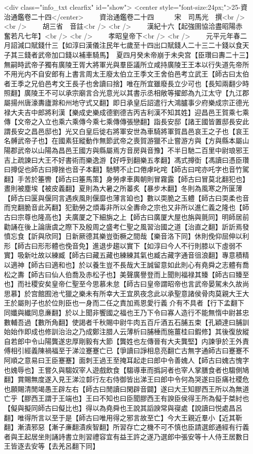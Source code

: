 <div class="info_txt clearfix" id="show">
<center style="font-size:24px;">25-資治通鑑卷二十四</center>
  　　資治通鑑卷二十四　　　宋　司馬光　撰<br />
<br />
　　胡三省　音註<br />
<br />
　　漢紀十六【起強圉協洽盡昭陽赤奮若凡七年】<br />
<br />
　　孝昭皇帝下<br />
<br />
　　元平元年春二月詔減口賦錢什三【如淳曰漢儀注民年七歲至十四出口賦錢人二十三二十錢以食天子其三錢者武帝加口錢以補車騎馬】　夏四月癸未帝崩于未央宫【臣瓚曰夀二十三】無嗣時武帝子獨有廣陵王胥大將軍光與羣臣議所立咸持廣陵王王本以行失道先帝所不用光内不自安郎有上書言周太王廢太伯立王季文王舍伯邑考立武王【師古曰太伯者王季之兄伯邑考文王長子也舍讀曰捨】唯在所宜雖廢長立少可也【長知兩翻少時照翻】廣陵王不可以承宗廟言合光意光以其書示丞相敞等擢郎為九江太守【九江郡屬揚州唐濠夀廬滁和州地守式又翻】即日承皇后詔遣行大鴻臚事少府樂成宗正德光禄大夫吉中郎將利漢【樂成史樂成德劉德吉丙吉利漢不知其姓】迎昌邑王賀乘七乘傳【文帝之入立也乘六乘傳今乘七乘傳傳張戀翻】詣長安邸【諸王國皆置邸長安此謂長安之昌邑邸也】光又白皇后徙右將軍安世為車騎將軍賀昌邑哀王之子也【哀王名髆武帝子也】在國素狂縱動作無節武帝之喪賀游獵不止嘗游方與【方與縣本屬山陽郡武帝以山陽為昌邑王國方與縣屬焉方音房與音豫】不半日馳二百里中尉琅邪王吉上疏諫曰大王不好書術而樂逸游【好呼到翻樂五孝翻】馮式撙衘【馮讀曰憑臣瓚曰撙促也師古曰撙挫也音子本翻】馳騁不止口倦虖叱咤【師古曰咤亦吒字也音竹駕翻】手苦於箠轡【師古曰箠馬策】身勞虖車輿朝則冒霧露【師古曰冒莫北翻犯也】晝則被塵埃【被皮義翻】夏則為大暑之所㬥炙【暴步木翻】冬則為風寒之所匽薄【師古曰匽與偃同言遇疾風則偃靡也薄言廹也】數以耎脆之玉軆【師古曰耎柔也音而兖翻脆音此芮翻】犯勤勞之煩毒非所以全夀命之宗也又非所以進仁義之隆也【師古曰宗尊也隆高也】夫廣厦之下細旃之上【師古曰廣厦大屋也旃與氈同】明師居前勸誦在後上論唐虞之際下及殷周之盛考仁聖之風習治國之道【治直之翻】訢訢焉發憤忘食【訢與欣同】日新厥德其樂豈衘橛之間哉【樂音洛下同】休則俛仰屈伸以利形【師古曰形形體也俛音免】進退步趨以實下【如淳曰今人不行則膝以下虛弱不實】吸新吐故以練臧【師古曰藏五藏也練練其氣也臧古藏字通音徂浪翻】專意積精以適神【師古曰適和也】於以養生豈不長哉大王誠留意如此則心有堯舜之志體有喬松之夀【師古曰仙人伯喬及赤松子也】美聲廣譽登而上聞則福禄其臻【師古曰臻至也】而社稷安矣皇帝仁聖至今思慕未怠【師古曰皇帝謂昭帝也言武帝晏駕未久故尚思慕】於宫館囿池弋獵之樂未有所幸大王宜夙夜念此以承聖意諸侯骨肉莫親大王大王於屬則子也於位則臣也一身而二任之責加焉恩愛行義介有不具者【行下孟翻下同孅與纎同息亷翻】於以上聞非饗國之福也王乃下令曰寡人造行不能無惰中尉甚忠數輔吾過【數所角翻】使謁者千秋賜中尉牛肉五百斤酒五石脯五束【孔穎達曰脯訓始始作即成也修訓治治之乃成鄭注腊人云薄析曰脯棰而施薑桂曰鍜修】其後復放縱自若郎中令山陽龔遂忠厚剛毅有大節【龔姓也左傳晉有大夫龔堅】内諫爭於王外責傅相引經義陳禍福至于涕泣蹇蹇亡已【爭讀曰諍相息亮翻亡古無字通師古曰蹇蹇不阿順之意易曰王臣蹇蹇】面刺王過王至掩耳起走曰郎中令善媿人【師古曰媿古愧字也媿辱也】王嘗久與騶奴宰人遊戲飲食【騶導車而撝訶者也宰人掌膳食者也騶側鳩翻】賞賜無度遂入見王涕泣䣛行左右侍御皆出涕王曰郎中令何為哭遂曰臣痛社稷危也願賜清閒竭愚王辟左右【師古曰閒讀曰閑辟音闢】遂曰大王知膠西王所以為無道亡乎【膠西王謂于王端也】王曰不知也曰臣聞膠西王有諛臣侯得王所為儗于桀紂也【儗與擬同師古曰儗比也】得以為堯舜也王說其謟諛常與寑處【說讀曰悦處昌呂翻】唯得所言以至于是【師古曰唯用得之邪言故至亡】今大王親近羣小【近其靳翻】漸漬邪惡【漸子亷翻漬疾智翻】所習存亡之機不可不慎也臣請選郎通經有行義者與王起居坐則誦詩書立則習禮容宜有益王許之遂乃選郎中張安等十人侍王居數日王皆逐去安等【去羌呂翻下同】